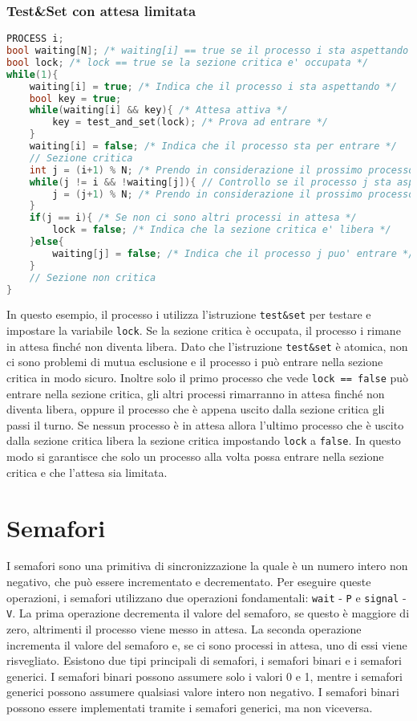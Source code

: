         \subsubsection{Test\&Set con attesa limitata}
            \begin{lstlisting}[language=C++,basicstyle=\footnotesize]
PROCESS i;
bool waiting[N]; /* waiting[i] == true se il processo i sta aspettando */
bool lock; /* lock == true se la sezione critica e' occupata */
while(1){
    waiting[i] = true; /* Indica che il processo i sta aspettando */
    bool key = true;
    while(waiting[i] && key){ /* Attesa attiva */
        key = test_and_set(lock); /* Prova ad entrare */
    }
    waiting[i] = false; /* Indica che il processo sta per entrare */
    // Sezione critica
    int j = (i+1) % N; /* Prendo in considerazione il prossimo processo */
    while(j != i && !waiting[j]){ // Controllo se il processo j sta aspettando
        j = (j+1) % N; /* Prendo in considerazione il prossimo processo */
    } 
    if(j == i){ /* Se non ci sono altri processi in attesa */
        lock = false; /* Indica che la sezione critica e' libera */
    }else{
        waiting[j] = false; /* Indica che il processo j puo' entrare */
    }
    // Sezione non critica
}
            \end{lstlisting}
            In questo esempio, il processo i utilizza l'istruzione \texttt{test\&set} per testare e impostare la variabile \texttt{lock}. Se la sezione critica è occupata, il processo i rimane in attesa finché non diventa libera. Dato che l'istruzione \texttt{test\&set} è atomica, non ci sono problemi di mutua esclusione e il processo i può entrare nella sezione critica in modo sicuro. Inoltre solo il primo processo che vede \texttt{lock == false} può entrare nella sezione critica, gli altri processi rimarranno in attesa finché non diventa libera, oppure il processo che è appena uscito dalla sezione critica gli passi il turno. Se nessun processo è in attesa allora l'ultimo processo che è uscito dalla sezione critica libera la sezione critica impostando \texttt{lock} a \texttt{false}. In questo modo si garantisce che solo un processo alla volta possa entrare nella sezione critica e che l'attesa sia limitata.
    
\section{Semafori}
    I semafori sono una primitiva di sincronizzazione la quale è un numero intero non negativo, che può essere incrementato e decrementato. Per eseguire queste operazioni, i semafori utilizzano due operazioni fondamentali: \texttt{wait} - \texttt{P} e \texttt{signal} - \texttt{V}. La prima operazione decrementa il valore del semaforo, se questo è maggiore di zero, altrimenti il processo viene messo in attesa. La seconda operazione incrementa il valore del semaforo e, se ci sono processi in attesa, uno di essi viene risvegliato.\newline
    Esistono due tipi principali di semafori, i semafori binari e i semafori generici. I semafori binari possono assumere solo i valori 0 e 1, mentre i semafori generici possono assumere qualsiasi valore intero non negativo. I semafori binari possono essere implementati tramite i semafori generici, ma non viceversa. 
